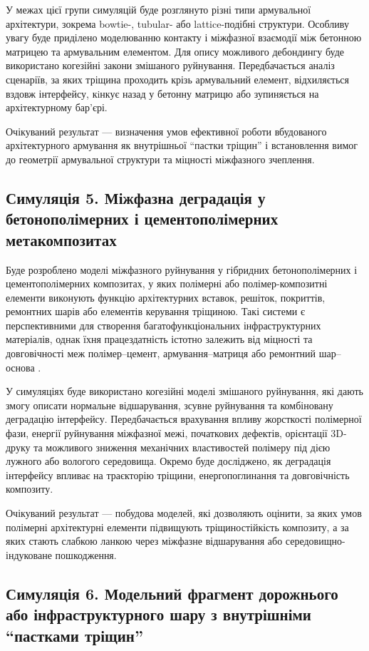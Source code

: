 \documentclass[12pt,a4paper]{article}
\begin{document}
У межах цієї групи симуляцій буде розглянуто різні типи армувальної архітектури, зокрема bowtie-, tubular- або lattice-подібні структури. Особливу увагу буде приділено моделюванню контакту і міжфазної взаємодії між бетонною матрицею та армувальним елементом. Для опису можливого дебондингу буде використано когезійні закони змішаного руйнування. Передбачається аналіз сценаріїв, за яких тріщина проходить крізь армувальний елемент, відхиляється вздовж інтерфейсу, кiнкує назад у бетонну матрицю або зупиняється на архітектурному бар'єрі.

Очікуваний результат --- визначення умов ефективної роботи вбудованого архітектурного армування як внутрішньої ``пастки тріщин'' і встановлення вимог до геометрії армувальної структури та міцності міжфазного зчеплення.

\subsection*{Симуляція 5. Міжфазна деградація у бетонополімерних і цементополімерних метакомпозитах}

Буде розроблено моделі міжфазного руйнування у гібридних бетонополімерних і цементополімерних композитах, у яких полімерні або полімер-композитні елементи виконують функцію архітектурних вставок, решіток, покриттів, ремонтних шарів або елементів керування тріщиною. Такі системи є перспективними для створення багатофункціональних інфраструктурних матеріалів, однак їхня працездатність істотно залежить від міцності та довговічності меж полімер--цемент, армування--матриця або ремонтний шар--основа \cite{Zhang2025,Jipa2022}.

У симуляціях буде використано когезійні моделі змішаного руйнування, які дають змогу описати нормальне відшарування, зсувне руйнування та комбіновану деградацію інтерфейсу. Передбачається врахування впливу жорсткості полімерної фази, енергії руйнування міжфазної межі, початкових дефектів, орієнтації 3D-друку та можливого зниження механічних властивостей полімеру під дією лужного або вологого середовища. Окремо буде досліджено, як деградація інтерфейсу впливає на траєкторію тріщини, енергопоглинання та довговічність композиту.

Очікуваний результат --- побудова моделей, які дозволяють оцінити, за яких умов полімерні архітектурні елементи підвищують тріщиностійкість композиту, а за яких стають слабкою ланкою через міжфазне відшарування або середовищно-індуковане пошкодження.

\subsection*{Симуляція 6. Модельний фрагмент дорожнього або інфраструктурного шару з внутрішніми ``пастками тріщин''}
\end{document}
